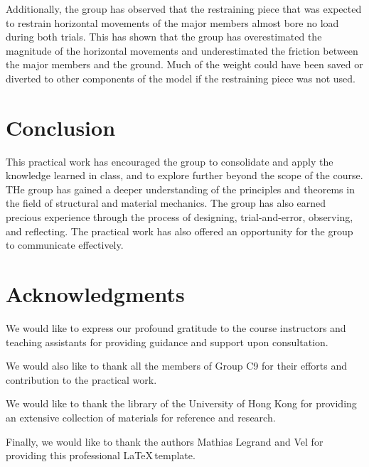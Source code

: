 \documentclass[fleqn,10pt]{SelfArx} %
\begin{document}
Additionally, the group has observed that the restraining piece that was expected to restrain
	horizontal movements of the major members almost bore no load during both trials.
	This has shown that the group has overestimated the magnitude of the horizontal
	movements and underestimated the friction between the major members and the ground.
	Much of the weight could have been saved or diverted to other components of the model
	if the restraining piece was not used.

\section{Conclusion}

This practical work has encouraged the group to consolidate and apply the knowledge
	learned in class, and to explore further beyond the scope of the course.
	THe group has gained a deeper understanding of the principles and theorems in
	the field of structural and material mechanics. The group has also earned precious
	experience through the process of designing, trial-and-error, observing, and reflecting.
	The practical work has also offered an opportunity for the group to communicate
	effectively.

\section*{Acknowledgments} %

We would like to express our profound gratitude to the course instructors
	and teaching assistants for providing guidance and support upon consultation.

We would also like to thank all the members of Group C9 for their efforts and
	contribution to the practical work.

We would like to thank the library of the University of Hong Kong for providing an
	extensive collection of materials for reference and research.

Finally, we would like to thank the authors Mathias Legrand and Vel for providing this
	professional \LaTeX\,template.





\end{document}

